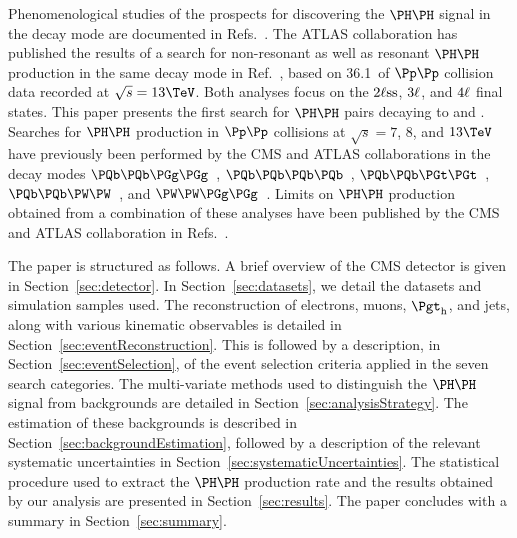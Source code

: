 Phenomenological studies of the prospects for discovering the $\HH$ signal in the \WWWW decay mode
are documented in Refs.~\cite{Baur:2002rb,Baur:2002qd,Li:2015yia,Adhikary:2017jtu,Ren:2017jbg}.
The ATLAS collaboration has published the results of a search for non-resonant as well as resonant $\HH$ production in the same decay mode in Ref.~\cite{Aaboud:2018ksn},
based on 36.1~\fbinv of $\Pp\Pp$ collision data recorded at $\sqrt{s} = 13\TeV$.
Both analyses focus on the $2\ell\text{ss}$, $3\ell$, and $4\ell$ final states.
This paper presents the first search for $\HH$ pairs decaying to \WWtt and \tttt.
Searches for $\HH$ production in $\Pp\Pp$ collisions at $\sqrt{s} = 7$, $8$, and $13\TeV$
have previously been performed by the CMS and ATLAS collaborations in the decay modes 
$\Pbottom\Pbottom\PGg\PGg$~\cite{Aad:2014yja,Khachatryan:2016sey,Sirunyan:2018iwt,Aaboud:2018ftw}, 
$\Pbottom\Pbottom\Pbottom\Pbottom$~\cite{Khachatryan:2015yea,Aad:2015uka,Aaboud:2018knk,Sirunyan:2018zkk,Sirunyan:2018tki}, 
$\Pbottom\Pbottom\PGt\PGt$~\cite{Aad:2015xja,Sirunyan:2017tqo,Sirunyan:2017djm,Aaboud:2018sfw}, 
$\Pbottom\Pbottom\PW\PW$~\cite{Sirunyan:2017guj}, 
and $\PW\PW\PGg\PGg$~\cite{Aaboud:2018ewm}.
Limits on $\HH$ production obtained from a combination of these analyses have been published by the CMS and ATLAS collaboration 
in Refs.~\cite{Aad:2015xja,Sirunyan:2017tqo,Sirunyan:2018ayu}.

The paper is structured as follows.
A brief overview of the CMS detector is given in Section~\ref{sec:detector}.
In Section~\ref{sec:datasets}, we detail the datasets and simulation samples used.
The reconstruction of electrons, muons, $\tauh$, and jets,
along with various kinematic observables is detailed in Section~\ref{sec:eventReconstruction}.
This is followed by a description, in Section~\ref{sec:eventSelection}, of the event selection criteria applied in the seven search categories.
The multi-variate methods used to distinguish the $\HH$ signal from backgrounds are detailed in Section~\ref{sec:analysisStrategy}.
The estimation of these backgrounds is described in Section~\ref{sec:backgroundEstimation},
followed by a description of the relevant systematic uncertainties in Section~\ref{sec:systematicUncertainties}.
The statistical procedure used to extract the $\HH$ production rate and the results obtained by our analysis are presented in Section~\ref{sec:results}.
The paper concludes with a summary in Section~\ref{sec:summary}.
